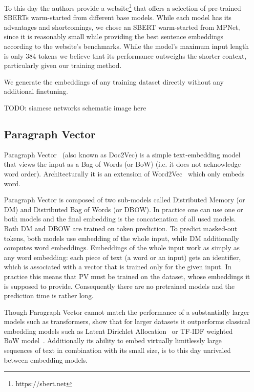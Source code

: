 To this day the authors provide a website\footnote{https://sbert.net} that
offers a selection of pre-trained SBERTs warm-started from different base
models. While each model has its advantages and shortcomings, we chose an SBERT
warm-started from MPNet, since it is reasonably small while providing the best
sentence embeddings according to the website's benchmarks. While the model's
maximum input length is only 384 tokens we believe that its performance
outweighs the shorter context, particularly given our training method.

We generate the embeddings of any training dataset directly without any
additional finetuning.

TODO: siamese networks schematic image here

\subsection{Paragraph Vector}

Paragraph Vector~\cite{le2014distributed} (also known as Doc2Vec) is a simple
text-embedding model that views the input as a Bag of Words (or BoW) (i.e. it
does not acknowledge word order). Architecturally it is an extension of
Word2Vec~\cite{mikolov2013efficient} which only embeds word.

Paragraph Vector is composed of two sub-models called Distributed Memory (or DM)
and Distributed Bag of Words (or DBOW). In practice one can use one or both
models and the final embedding is the concatenation of all used models. Both DM
and DBOW are trained on token prediction. To predict masked-out tokens, both
models use embedding of the whole input, while DM additionally computes word
embeddings. Embeddings of the whole input work as simply as any word embedding:
each piece of text (a word or an input) gets an identifier, which is associated
with a vector that is trained only for the given input. In practice this means
that PV must be trained on the dataset, whose embeddings it is supposed to
provide. Consequently there are no pretrained models and the prediction time is
rather long.

Though Paragraph Vector cannot match the performance of a substantially larger
models such as transformers, \cite{dai2015document} show that for larger
datasets it outperforms classical embedding models such as Latent Dirichlet
Allocation~\cite{blei2003latent} or TF-IDF weighted BoW
model~\cite{harris1954distributional}. Additionally its ability to embed
virtually limitlessly large sequences of text in combination with its small
size, is to this day unrivaled between embedding models.

